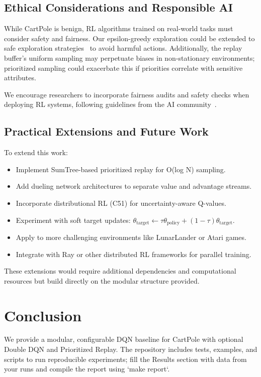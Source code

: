 \documentclass{IEEEtran}
\begin{document}
\subsection{Ethical Considerations and Responsible AI}

While CartPole is benign, RL algorithms trained on real-world tasks must consider safety and fairness. Our epsilon-greedy exploration could be extended to safe exploration strategies~\cite{garcia2015comprehensive} to avoid harmful actions. Additionally, the replay buffer's uniform sampling may perpetuate biases in non-stationary environments; prioritized sampling could exacerbate this if priorities correlate with sensitive attributes.

We encourage researchers to incorporate fairness audits and safety checks when deploying RL systems, following guidelines from the AI community~\cite{jobin2019global}.

\subsection{Practical Extensions and Future Work}

To extend this work:
\begin{itemize}
\item Implement SumTree-based prioritized replay for O(log N) sampling.
\item Add dueling network architectures to separate value and advantage streams.
\item Incorporate distributional RL (C51) for uncertainty-aware Q-values.
\item Experiment with soft target updates: $\theta_{\text{target}} \leftarrow \tau \theta_{\text{policy}} + (1-\tau) \theta_{\text{target}}$.
\item Apply to more challenging environments like LunarLander or Atari games.
\item Integrate with Ray or other distributed RL frameworks for parallel training.
\end{itemize}

These extensions would require additional dependencies and computational resources but build directly on the modular structure provided.

\section{Conclusion}

We provide a modular, configurable DQN baseline for CartPole with optional Double DQN and Prioritized Replay. The repository includes tests, examples, and scripts to run reproducible experiments; fill the Results section with data from your runs and compile the report using `make report`.
\end{document}

